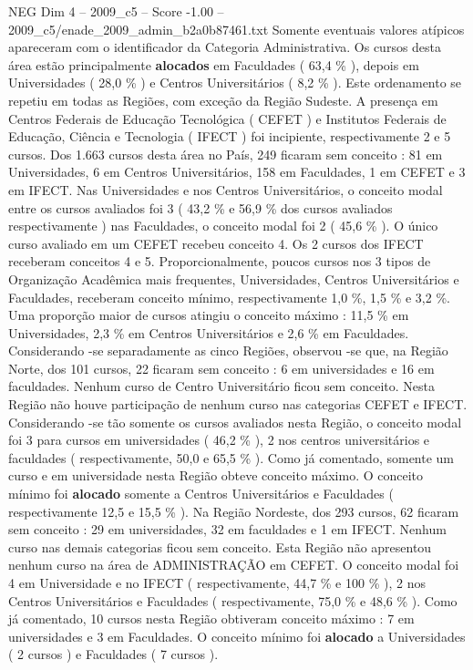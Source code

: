 \begin{textsample}{NEG Dim 4 – 2009\_c5 – Score -1.00 – 2009\_c5/enade\_2009\_admin\_b2a0b87461.txt}
Somente eventuais valores atípicos apareceram com o identificador da Categoria Administrativa.
Os cursos desta área estão principalmente \textbf{alocados} em Faculdades ( 63,4 \% ), depois em Universidades ( 28,0 \% ) e Centros Universitários ( 8,2 \% ).
Este ordenamento se repetiu em todas as Regiões, com exceção da Região Sudeste.
A presença em Centros Federais de Educação Tecnológica ( CEFET ) e Institutos Federais de Educação, Ciência e Tecnologia ( IFECT ) foi incipiente, respectivamente 2 e 5 cursos.
Dos 1.663 cursos desta área no País, 249 ficaram sem conceito : 81 em Universidades, 6 em Centros Universitários, 158 em Faculdades, 1 em CEFET e 3 em IFECT.
Nas Universidades e nos Centros Universitários, o conceito modal entre os cursos avaliados foi 3 ( 43,2 \% e 56,9 \% dos cursos avaliados respectivamente ) nas Faculdades, o conceito modal foi 2 ( 45,6 \% ).
O único curso avaliado em um CEFET recebeu conceito 4.
Os 2 cursos dos IFECT receberam conceitos 4 e 5.
Proporcionalmente, poucos cursos nos 3 tipos de Organização Acadêmica mais frequentes, Universidades, Centros Universitários e Faculdades, receberam conceito mínimo, respectivamente 1,0 \%, 1,5 \% e 3,2 \%.
Uma proporção maior de cursos atingiu o conceito máximo : 11,5 \% em Universidades, 2,3 \% em Centros Universitários e 2,6 \% em Faculdades.
Considerando -se separadamente as cinco Regiões, observou -se que, na Região Norte, dos 101 cursos, 22 ficaram sem conceito : 6 em universidades e 16 em faculdades.
Nenhum curso de Centro Universitário ficou sem conceito.
Nesta Região não houve participação de nenhum curso nas categorias CEFET e IFECT.
Considerando -se tão somente os cursos avaliados nesta Região, o conceito modal foi 3 para cursos em universidades ( 46,2 \% ), 2 nos centros universitários e faculdades ( respectivamente, 50,0 e 65,5 \% ).
Como já comentado, somente um curso e em universidade nesta Região obteve conceito máximo.
O conceito mínimo foi \textbf{alocado} somente a Centros Universitários e Faculdades ( respectivamente 12,5 e 15,5 \% ).
Na Região Nordeste, dos 293 cursos, 62 ficaram sem conceito : 29 em universidades, 32 em faculdades e 1 em IFECT.
Nenhum curso nas demais categorias ficou sem conceito.
Esta Região não apresentou nenhum curso na área de ADMINISTRAÇÃO em CEFET.
O conceito modal foi 4 em Universidade e no IFECT ( respectivamente, 44,7 \% e 100 \% ), 2 nos Centros Universitários e Faculdades ( respectivamente, 75,0 \% e 48,6 \% ).
Como já comentado, 10 cursos nesta Região obtiveram conceito máximo : 7 em universidades e 3 em Faculdades.
O conceito mínimo foi \textbf{alocado} a Universidades ( 2 cursos ) e Faculdades ( 7 cursos ).

\end{textsample}
